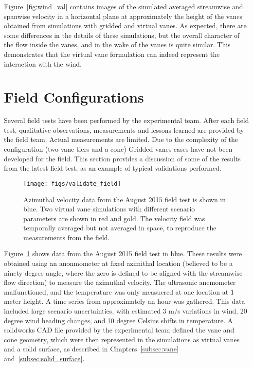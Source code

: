 Figure~\ref{fig:wind_val} contains images of the simulated averaged
streamwise and  spanwise velocity in a horizontal plane at approximately
the height of the vanes obtained from simulations with gridded and
virtual vanes. As expected, there are some differences in the
details of these simulations, but the overall character of the flow
inside the vanes, and in the wake of the vanes is quite similar. This
demonstrates that the virtual vane formulation can indeed represent the
interaction with the wind. 

\section{Field Configurations}

Several field tests have been performed by the experimental team. After
each field test, qualitative observations, measurements and lessons
learned are provided by the field team. Actual measurements
are limited. Due to the complexity of the configuration
(two vane tiers and a cone) Gridded vanes cases have not been developed
for the field. This section provides a discussion of some of
the results from the latest field test, as an example of typical
validations performed. 

 \begin{figure}[!htb]
  \begin{center}
   \texttt{[image: figs/validate\_field]}
   \caption{Azimuthal velocity data from the August 2015 field test is
   shown in blue. Two virtual vane simulations with different scenario
   parameters are shown in red and gold. The velocity field was
   temporally averaged but not averaged in space, to reproduce
   the measurements from the field.}
   \label{fig:field_val}
  \end{center}
 \end{figure}
%
%

Figure~\ref{fig:field_val} shows data from the August 2015 field test in
blue. These results were obtained using an anonmometer at fixed
azimithal location (believed to be a ninety degree angle, where the zero
is defined to be aligned with the streamwise flow direction) to measure the
azimuthal velocity. The ultrasonic 
anemometer malfunctioned, and the temperature was only measuered at one
location at 1 meter height. A time series from approximately an hour was
gathered. This data included large scenario uncertainties, with
estimated 3 m/s variations in wind, 20 degree wind heading changes, and
10 degree Celsius shifts in temperature. A solidworks CAD file provided
by the experimental team defined the vane and cone
geometry, which were then represented in the simulations as virtual
vanes and a solid surface, as described in 
Chapters~\ref{subsec:vane} and~\ref{subsec:solid_surface}.   

